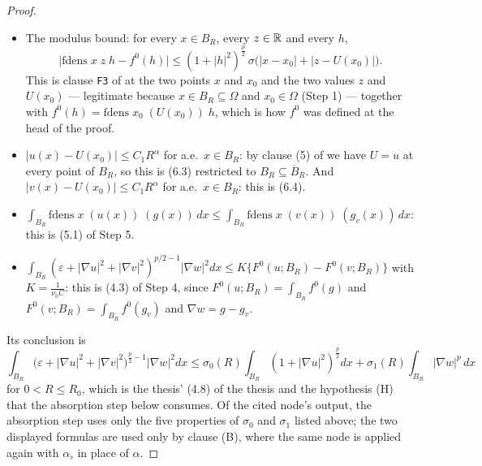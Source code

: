 \begin{proof}
\begin{itemize}
  measurable.  Replacing $u$ and $g$ by strongly measurable representatives,
  which changes $x\mapsto\mathrm{fdens}\;x\;(u(x))\;(g(x))$ only on a null set,
  and composing that jointly measurable map with the measurable
  $x\mapsto(u(x),g(x),x)$, gives the measurability of
  $x\mapsto\mathrm{fdens}\;x\;(u(x))\;(g(x))$; the same with $(v,g_v)$.  By
  domination (Preamble) all four are integrable on $B_R$.
\item The modulus bound: for every $x\in B_R$, every $z\in\mathbb{R}$ and every $h$,
  \[
  \bigl|\mathrm{fdens}\;x\;z\;h-f^0(h)\bigr|
  \le(1+|h|^2)^{\frac p2}\,\sigma\bigl(|x-x_0|+|z-U(x_0)|\bigr).
  \]
  This is clause \texttt{F3} of  at the two
  points $x$ and $x_0$ and the two values $z$ and $U(x_0)$ --- legitimate
  because $x\in B_R\subseteq\Omega$ and $x_0\in\Omega$ (Step 1) --- together
  with $f^0(h)=\mathrm{fdens}\;x_0\;(U(x_0))\;h$, which is how $f^0$ was
  defined at the head of the proof.
\item $|u(x)-U(x_0)|\le C_1R^{\alpha}$ for a.e.\ $x\in B_R$: by clause (5) of
   we have $U=u$ at every point of $B_R$, so this
  is (6.3) restricted to $B_R\subseteq\overline B_R$.  And
  $|v(x)-U(x_0)|\le C_1R^{\alpha}$ for a.e.\ $x\in B_R$: this is (6.4).
\item $\int_{B_R}\mathrm{fdens}\;x\;(u(x))\;(g(x))\,dx\le\int_{B_R}
  \mathrm{fdens}\;x\;(v(x))\;(g_v(x))\,dx$: this is (5.1) of Step 5.
\item $\int_{B_R}(\varepsilon+|\nabla u|^2+|\nabla v|^2)^{p/2-1}|\nabla w|^2dx
  \le K\bigl\{F^0(u;B_R)-F^0(v;B_R)\bigr\}$ with $K=\frac1{\nu_0C}$: this is
  (4.3) of Step 4, since $F^0(u;B_R)=\int_{B_R}f^0(g)$ and
  $F^0(v;B_R)=\int_{B_R}f^0(g_v)$ and $\nabla w=g-g_v$.
\end{itemize}
Its conclusion is
\[
\int_{B_R}\bigl(\varepsilon+|\nabla u|^2+|\nabla v|^2\bigr)^{\frac p2-1}
|\nabla w|^2dx
\le\sigma_0(R)\int_{B_R}(1+|\nabla u|^2)^{\frac p2}dx
+\sigma_1(R)\int_{B_R}|\nabla w|^p\,dx
\tag{4.8}
\]
for $0<R\le R_0$, which is the thesis' (4.8) of the thesis and the hypothesis (H)
that the absorption step below consumes.  Of the cited node's output, the
absorption step uses only the five properties of $\sigma_0$ and $\sigma_1$
listed above; the two displayed formulas are used only by clause (B), where the
same node is applied again with $\alpha_\flat$ in place of $\alpha$.


\end{proof}

